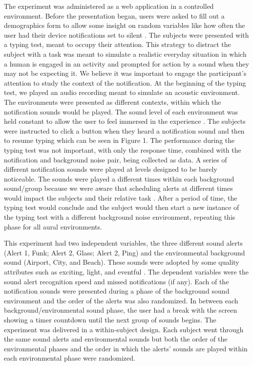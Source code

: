 \documentclass[manuscript,screen,review]{acmart}
\begin{document}
The experiment was administered as a web application in a controlled environment. Before the presentation began, users were asked to fill out a demographics form to allow some insight on random variables like how often the user had their device notifications set to silent \cite{2702613.2732704}. The subjects were presented with a typing test, meant to occupy their attention. This strategy to distract the subject with a task was meant to simulate a realistic everyday situation in which a human is engaged in an activity and prompted for action by a sound when they may not be expecting it. We believe it was important to engage the participant’s attention to study the context of the notification. At the beginning of the typing test, we played an audio recording meant to simulate an acoustic environment. The environments were presented as different contexts, within which the notification sounds would be played. The sound level of each environment was held constant to allow the user to feel immersed in the experience \cite{raimbault2005urban}. The subjects were instructed to click a button when they heard a notification sound and then to resume typing which can be seen in Figure 1. The performance during the typing test was not important, with only the response time, combined with the notification and background noise pair, being collected as data. A series of different notification sounds were played at levels designed to be barely noticeable. The sounds were played a different times within each background sound/group because we were aware that scheduling alerts at different times would impact the subjects and their relative task \cite{1357054.1357070}. After a period of time, the typing test would conclude and the subject would then start a new instance of the typing test with a different background noise environment, repeating this phase for all aural environments.

This experiment had two independent variables, the three different sound alerts (Alert 1, Funk; Alert 2, Glass; Alert 2, Ping) and the environmental background sound (Airport, City, and Beach). These sounds were adopted by some quality attributes such as exciting, light, and eventful \cite{berglund2006tool}. The dependent variables were the sound alert recognition speed and missed notifications (if any). Each of the notification sounds were presented during a phase of the background sound environment and the order of the alerts was also randomized. In between each background/environmental sound phase, the user had a break with the screen showing a timer countdown until the next group of sounds begins. The experiment was delivered in a within-subject design. Each subject went through the same sound alerts and environmental sounds but both the order of the environmental phases and the order in which the alerts' sounds are played within each environmental phase were randomized. 
\end{document}

